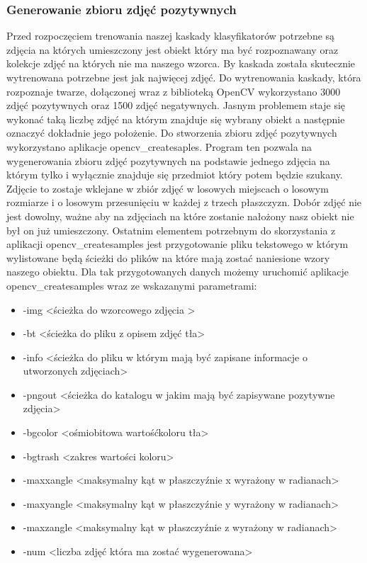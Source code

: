 \documentclass{article}
\numberwithin{equation}{section}
\begin{document}
\subsubsection{Generowanie zbioru zdjęć pozytywnych}\label{sec:generowanieZdjec}
Przed rozpoczęciem trenowania naszej kaskady klasyfikatorów potrzebne są zdjęcia na których umieszczony jest  obiekt który ma być rozpoznawany oraz kolekcje zdjęć na których nie ma naszego wzorca. By kaskada została skutecznie wytrenowana potrzebne jest jak najwięcej zdjęć. Do wytrenowania kaskady, która rozpoznaje twarze, dołączonej wraz z biblioteką OpenCV wykorzystano 3000 zdjęć pozytywnych oraz 1500 zdjęć negatywnych. Jasnym problemem staje się wykonać taką liczbę zdjęć na którym znajduje się wybrany obiekt a następnie oznaczyć dokładnie jego położenie. Do stworzenia zbioru zdjęć pozytywnych wykorzystano aplikacje opencv\_createsaples. Program ten pozwala na wygenerowania zbioru zdjęć pozytywnych na podstawie jednego zdjęcia na którym tylko i wyłącznie znajduje się przedmiot który potem będzie szukany. Zdjęcie to zostaje wklejane w zbiór zdjęć w losowych miejscach o losowym rozmiarze i o losowym przesunięciu w każdej z trzech płaszczyzn. Dobór zdjęć nie jest dowolny, ważne aby na zdjęciach na które zostanie nałożony nasz obiekt nie był on już umieszczony. Ostatnim elementem potrzebnym do skorzystania z aplikacji opencv\_createsamples jest przygotowanie pliku tekstowego w którym wylistowane będą ścieżki do plików na które mają zostać naniesione wzory naszego obiektu. Dla tak przygotowanych danych możemy uruchomić aplikacje opencv\_createsamples wraz ze wskazanymi parametrami:
\begin{itemize}
    \item -img \textless ścieżka do wzorcowego zdjęcia \textgreater
    \item -bt \textless ścieżka do pliku z opisem zdjęć tła\textgreater
    \item -info \textless ścieżka do pliku w którym mają być zapisane informacje o utworzonych zdjęciach\textgreater
    \item -pngout \textless ścieżka do katalogu w jakim mają być zapisywane pozytywne zdjęcia\textgreater
    \item -bgcolor \textless ośmiobitowa wartośćkoloru tła\textgreater
    \item -bgtrash \textless zakres wartości koloru\textgreater
    \item -maxxangle \textless maksymalny kąt w płaszczyźnie x wyrażony w radianach\textgreater
    \item -maxyangle \textless maksymalny kąt w płaszczyźnie y wyrażony w radianach\textgreater
    \item -maxzangle \textless maksymalny kąt w płaszczyźnie z wyrażony w radianach\textgreater
    \item -num \textless liczba zdjęć która ma zostać wygenerowana>

\end{itemize}
\end{document}
